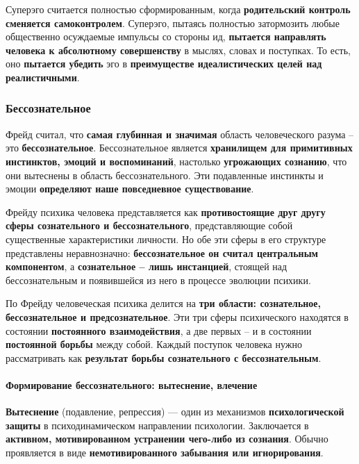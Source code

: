 \documentclass{article}
\begin{document}
\begin{flushleft}
Суперэго считается полностью сформированным, когда \textbf{родительский контроль сменяется самоконтролем}. Суперэго, пытаясь полностью затормозить любые общественно осуждаемые импульсы со стороны ид, \textbf{пытается направлять человека к абсолютному совершенству} в мыслях, словах и поступках. То есть, оно \textbf{пытается убедить} эго в \textbf{преимуществе идеалистических целей над реалистичными}.

\end{flushleft}

\subsubsection{Бессознательное}

\begin{flushleft}

Фрейд считал, что \textbf{самая глубинная и значимая} область человеческого разума – это \textbf{бессознательное}. Бессознательное является \textbf{хранилищем для примитивных инстинктов, эмоций и воспоминаний}, настолько \textbf{угрожающих сознанию}, что они вытеснены в область бессознательного. Эти подавленные инстинкты и эмоции \textbf{определяют наше повседневное существование}.

\hfill

Фрейду психика человека представляется как \textbf{противостоящие друг
другу сферы сознательного и бессознательного}, представляющие собой существенные характеристики личности. Но обе эти сферы в его структуре представлены неравнозначно: \textbf{бессознательное он считал центральным компонентом}, а \textbf{сознательное – лишь инстанцией}, стоящей над бессознательным и появившейся из него в процессе эволюции психики.

\hfill

По Фрейду человеческая психика делится на \textbf{три области: сознательное, бессознательное и предсознательное}. Эти три сферы психического находятся в состоянии \textbf{постоянного взаимодействия}, а две первых – и в состоянии \textbf{постоянной борьбы} между собой. Каждый поступок человека нужно рассматривать как \textbf{результат борьбы сознательного с бессознательным}.

\paragraph{Формирование бессознательного: вытеснение, влечение}

\textbf{Вытеснение} (подавление, репрессия) — один из механизмов \textbf{психологической защиты} в психодинамическом направлении психологии. Заключается в \textbf{активном, мотивированном устранении чего-либо из сознания}. Обычно проявляется в виде \textbf{немотивированного забывания или игнорирования}.


\end{flushleft}
\end{document}
